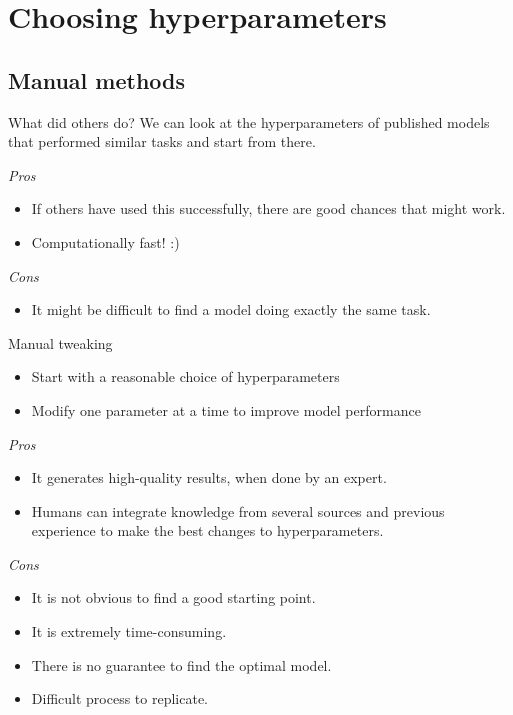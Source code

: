 \documentclass[9pt, aspectratio=169]{beamer}
\begin{document}
\section{Choosing hyperparameters}
\subsection{Manual methods}

\begin{frame}
    {What did others do?}
    We can look at the hyperparameters of published models that performed similar tasks and start from there.

    \textit{Pros}
    \begin{itemize}
        \item If others have used this successfully, there are good chances that might work.
        \item Computationally fast! :)
    \end{itemize}
    \pause
    \textit{Cons}
    \begin{itemize}
        \item It might be difficult to find a model doing exactly the same task.
    \end{itemize}
\end{frame}

\begin{frame}
    {Manual tweaking}
    \begin{itemize}
        \item Start with a reasonable choice of hyperparameters
        \item Modify one parameter at a time to improve model performance
    \end{itemize}
    \pause
    \textit{Pros}
    \begin{itemize}
        \item It generates high-quality results, when done by an expert.
        \item Humans can integrate knowledge from several sources and previous experience to make the best changes to hyperparameters.
    \end{itemize}
    \pause
    \textit{Cons}
    \begin{itemize}
        \item It is not obvious to find a good starting point.
        \item It is extremely time-consuming.
        \item There is no guarantee to find the optimal model.
        \item Difficult process to replicate.
    \end{itemize}
\end{frame}
\end{document}
